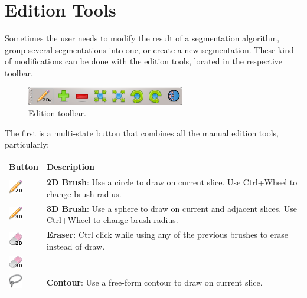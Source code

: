\section{Edition Tools}

Sometimes the user needs to modify the result of a segmentation algorithm, 
group several segmentations into one, or create a new segmentation. These kind
of modifications can be done with the edition tools, located in the respective
toolbar.\\

\begin{figure}[H]
\centering
\includegraphics{fig/EditorToolbar}
\caption{Edition toolbar.}
\end{figure}

The first is a multi-state button that combines all the manual edition tools,
particularly:\\

\vspace{0.1cm}
\begin{tabular}{| m{1.3cm} | m{12cm} |}
\hline
\textbf{Button} & \textbf{Description}\\
\hline
\includegraphics[width=0.6cm]{../../frontend/rsc/pencil2D} &
\textbf{2D Brush}: Use a circle to draw on current slice. Use Ctrl+Wheel to
change brush radius.\\
\hline
\includegraphics[width=0.6cm]{../../frontend/rsc/pencil3D} &
\textbf{3D Brush}: Use a sphere to draw on current and adjacent slices. Use
Ctrl+Wheel to change brush radius.\\
\hline
\includegraphics[width=0.6cm]{../../frontend/rsc/eraser2D} &
\textbf{Eraser}: Ctrl click while using any of the previous brushes to erase
instead of draw.\\
\includegraphics[width=0.6cm]{../../frontend/rsc/eraser3D} & \\
\hline
\includegraphics[width=0.6cm]{../../frontend/rsc/lasso} &
\textbf{Contour}: Use a free-form contour to draw on current slice.\\
\hline
\end{tabular}
\vspace{0.3cm}


